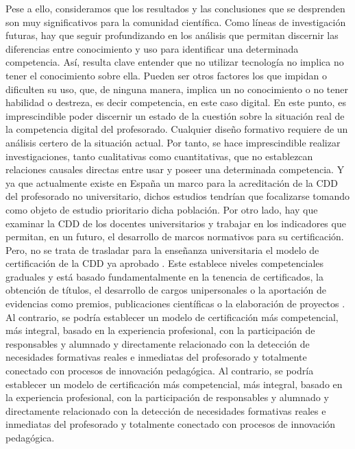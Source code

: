 \documentclass[spanish]{textolivre}
\begin{document}
Pese a ello, consideramos que los resultados y las conclusiones que se desprenden son muy significativos para la comunidad científica. Como líneas de investigación futuras, hay que seguir profundizando en los análisis que permitan discernir las diferencias entre conocimiento y uso para identificar una determinada competencia. Así, resulta clave entender que no utilizar tecnología no implica no tener el conocimiento sobre ella. Pueden ser otros factores los que impidan o dificulten su uso, que, de ninguna manera, implica un no conocimiento o no tener habilidad o destreza, es decir competencia, en este caso digital. En este punto, es imprescindible poder discernir un estado de la cuestión sobre la situación real de la competencia digital del profesorado. Cualquier diseño formativo requiere de un análisis certero de la situación actual. Por tanto, se hace imprescindible realizar investigaciones, tanto cualitativas como cuantitativas, que no establezcan relaciones causales directas entre usar y poseer una determinada competencia. Y ya que actualmente existe en España un marco para la acreditación de la CDD del profesorado no universitario, dichos estudios tendrían que focalizarse tomando como objeto de estudio prioritario dicha población. Por otro lado, hay que examinar la CDD de los docentes universitarios y trabajar en los indicadores que permitan, en un futuro, el desarrollo de marcos normativos para su certificación. Pero, no se trata de trasladar para la enseñanza universitaria el modelo de certificación de la CDD ya aprobado \cite{boe2022b}. Este establece niveles competenciales graduales y está basado fundamentalmente en la tenencia de certificados, la obtención de títulos, el desarrollo de cargos unipersonales o la aportación de evidencias como premios, publicaciones científicas o la elaboración de proyectos \cite{generalitat2023}. Al contrario, se podría establecer un modelo de certificación más competencial, más integral, basado en la experiencia profesional, con la participación de responsables y alumnado y directamente relacionado con la detección de necesidades formativas reales e inmediatas del profesorado y totalmente conectado con procesos de innovación pedagógica. Al contrario, se podría establecer un modelo de certificación más competencial, más integral, basado en la experiencia profesional, con la participación de responsables y alumnado y directamente relacionado con la detección de necesidades formativas reales e inmediatas del profesorado y totalmente conectado con procesos de innovación pedagógica.
\end{document}
